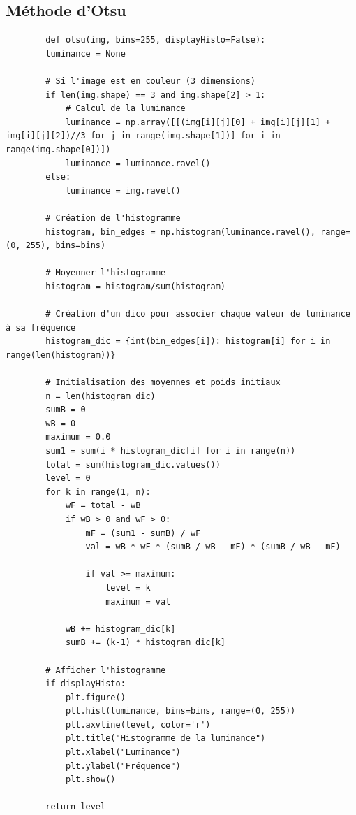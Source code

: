 \documentclass{rapport}
\begin{document}
\subsection{Méthode d'Otsu}
\begin{multicols}{2}
	\begin{lstlisting}
		def otsu(img, bins=255, displayHisto=False):
		luminance = None
		
		# Si l'image est en couleur (3 dimensions)
		if len(img.shape) == 3 and img.shape[2] > 1:
			# Calcul de la luminance 
			luminance = np.array([[(img[i][j][0] + img[i][j][1] + img[i][j][2])//3 for j in range(img.shape[1])] for i in range(img.shape[0])])
			luminance = luminance.ravel()
		else:
			luminance = img.ravel()
		
		# Création de l'histogramme
		histogram, bin_edges = np.histogram(luminance.ravel(), range=(0, 255), bins=bins)
		
		# Moyenner l'histogramme
		histogram = histogram/sum(histogram)    
		
		# Création d'un dico pour associer chaque valeur de luminance à sa fréquence
		histogram_dic = {int(bin_edges[i]): histogram[i] for i in range(len(histogram))}
		
		# Initialisation des moyennes et poids initiaux
		n = len(histogram_dic)
		sumB = 0
		wB = 0
		maximum = 0.0
		sum1 = sum(i * histogram_dic[i] for i in range(n))
		total = sum(histogram_dic.values())
		level = 0
		for k in range(1, n):
			wF = total - wB
			if wB > 0 and wF > 0:
				mF = (sum1 - sumB) / wF
				val = wB * wF * (sumB / wB - mF) * (sumB / wB - mF)
				
				if val >= maximum:
					level = k
					maximum = val
			
			wB += histogram_dic[k]
			sumB += (k-1) * histogram_dic[k]
		
		# Afficher l'histogramme
		if displayHisto:
			plt.figure()
			plt.hist(luminance, bins=bins, range=(0, 255))
			plt.axvline(level, color='r')
			plt.title("Histogramme de la luminance")
			plt.xlabel("Luminance")
			plt.ylabel("Fréquence")
			plt.show()
		
		return level
	
	\end{lstlisting}
\end{multicols}
\end{document}
